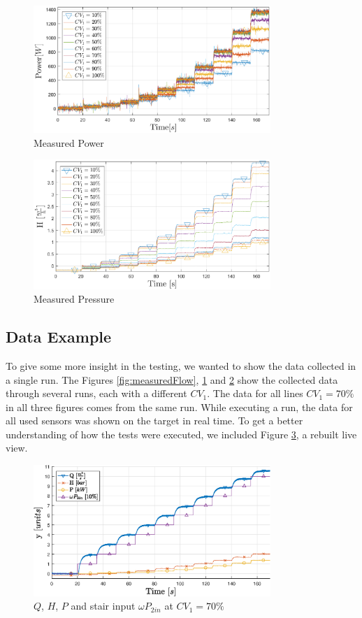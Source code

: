 \begin{figure}[H]
	\centering
	\includegraphics[width=0.8\textwidth]{figures/05mathematicalModelling/measuredPower.eps}
	\caption{Measured Power}
	\label{fig:measuredPower}
\end{figure}

\begin{figure}[H]
	\centering
	\includegraphics[width=0.8\textwidth]{figures/05mathematicalModelling/measuredPressure.eps}
	\caption{Measured Pressure}
	\label{fig:measuredPressure}
\end{figure}

\subsection{Data Example}%
To give some more insight in the testing,
we wanted to show the data collected in a single run.
The Figures \ref{fig:measuredFlow}, \ref{fig:measuredPower} and \ref{fig:measuredPressure}
show the collected data through several runs,
each with a different $CV_1$.
The data for all lines $CV_1 = 70\%$ in all three figures comes from the same run.
While executing a run,
the data for all used sensors was shown on the target in real time.
To get a better understanding of how the tests were executed,
we included Figure \ref{fig:testrun},
a rebuilt live view.

\begin{figure}[H]
	\centering
	\includegraphics[width=0.8\textwidth]{figures/04ExperimentsAndLabWork/testrun.eps}
	\caption{$Q$, $H$, $P$ and stair input $\omega P_{2in}$ at $CV_1 = 70\%$}
	\label{fig:testrun}
\end{figure}
